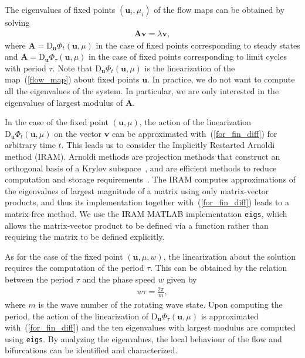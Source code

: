 The eigenvalues of fixed points $(\mathbf{u}_i,\mu_i)$ of the flow maps can be obtained by solving
\begin{align}
\label{eig_prob}
\mathbf{Av} = \lambda\mathbf{v},
\end{align}
where $\mathbf{A} = \mathrm{D}_{\mathbf{u}}\Phi_t(\mathbf{u},\mu)$ in the case of fixed points corresponding to steady states and $\mathbf{A} = \mathrm{D}_{\mathbf{u}}\Phi_{\tau}(\mathbf{u},\mu)$ in the case of fixed points corresponding to limit cycles with period $\tau$. Note that $\mathrm{D}_{\mathbf{u}}\Phi_t(\mathbf{u},\mu)$ is the linearization of the map~(\ref{flow_map}) about fixed points $\mathbf{u}$. In practice, we do not want to compute all the eigenvalues of the system. In particular, we are only interested in the eigenvalues of largest modulus of $\mathbf{A}$.

In the case of the fixed point $(\mathbf{u},\mu)$, the action of the linearization $\mathrm{D}_{\mathbf{u}}\Phi_t(\mathbf{u},\mu)$ on the vector $\mathbf{v}$ can be approximated with~(\ref{for_fin_diff}) for arbitrary time $t$. This leads us to consider the Implicitly Restarted Arnoldi method (IRAM). Arnoldi methods are projection methods that construct an orthogonal basis of a Krylov subspace~\cite{tref_num_lin_alg}, and are efficient methods to reduce computation and storage requirements~\cite{eig_arpackusers}. The IRAM computes approximations of the eigenvalues of largest magnitude of a matrix using only matrix-vector products, and thus its implementation together with~(\ref{for_fin_diff}) leads to a matrix-free method. We use the IRAM MATLAB implementation \texttt{eigs}, which allows the matrix-vector product to be defined via a function rather than requiring the matrix to be defined explicitly.

As for the case of the fixed point $(\mathbf{u},\mu,w)$, the linearization about the solution requires the computation of the period $\tau$. This can be obtained by the relation between the period $\tau$ and the phase speed $w$ given by
\begin{align}
\label{period_comp}
w\tau = \frac{2\pi}{m},
\end{align}
where $m$ is the wave number of the rotating wave state. Upon computing the period, the action of the linearization of $\mathrm{D}_{\mathbf{u}}\Phi_\tau(\mathbf{u},\mu)$ is approximated with~(\ref{for_fin_diff}) and the ten eigenvalues with largest modulus are computed using \texttt{eigs}. By analyzing the eigenvalues, the local behaviour of the flow and bifurcations can be identified and characterized.


